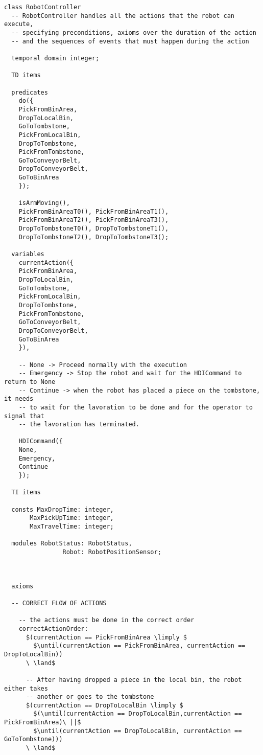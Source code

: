 \begin{lstlisting}[fontadjust, mathescape, frame=single]
class RobotController
  -- RobotController handles all the actions that the robot can execute, 
  -- specifying preconditions, axioms over the duration of the action
  -- and the sequences of events that must happen during the action

  temporal domain integer;

  TD items

  predicates
    do({
    PickFromBinArea,
    DropToLocalBin,
    GoToTombstone,
    PickFromLocalBin,
    DropToTombstone,
    PickFromTombstone,
    GoToConveyorBelt,
    DropToConveyorBelt,
    GoToBinArea
    });

    isArmMoving(),
    PickFromBinAreaT0(), PickFromBinAreaT1(),
    PickFromBinAreaT2(), PickFromBinAreaT3(),
    DropToTombstoneT0(), DropToTombstoneT1(),
    DropToTombstoneT2(), DropToTombstoneT3();

  variables
    currentAction({
    PickFromBinArea,
    DropToLocalBin,
    GoToTombstone,
    PickFromLocalBin,
    DropToTombstone,
    PickFromTombstone,
    GoToConveyorBelt,
    DropToConveyorBelt,
    GoToBinArea
    }),

    -- None -> Proceed normally with the execution
    -- Emergency -> Stop the robot and wait for the HDICommand to return to None
    -- Continue -> when the robot has placed a piece on the tombstone, it needs 
    -- to wait for the lavoration to be done and for the operator to signal that 
    -- the lavoration has terminated.

    HDICommand({
    None,
    Emergency,
    Continue
    });
    
  TI items 
  
  consts MaxDropTime: integer,
       MaxPickUpTime: integer,
       MaxTravelTime: integer;

  modules RobotStatus: RobotStatus,
                Robot: RobotPositionSensor;

  
  
  axioms

  -- CORRECT FLOW OF ACTIONS

    -- the actions must be done in the correct order
    correctActionOrder:
      $(currentAction == PickFromBinArea \limply $
        $\until(currentAction == PickFromBinArea, currentAction == DropToLocalBin))
      \ \land$

      -- After having dropped a piece in the local bin, the robot either takes 
      -- another or goes to the tombstone
      $(currentAction == DropToLocalBin \limply $
        $(\until(currentAction == DropToLocalBin,currentAction == PickFromBinArea)\ ||$
        $\until(currentAction == DropToLocalBin, currentAction == GoToTombstone)))
      \ \land$


\end{lstlisting}
